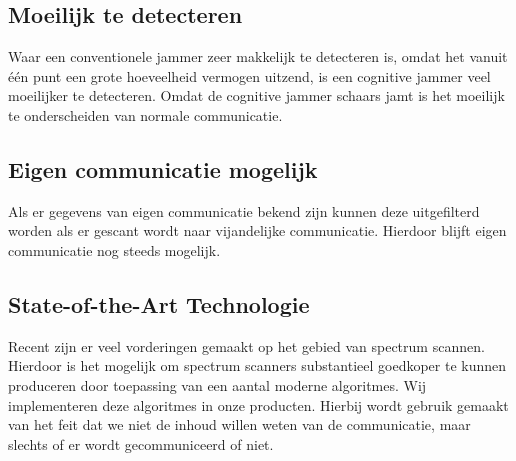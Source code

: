 \documentclass[oneside, a4paper, openany]{article}
\begin{document}
\subsection{Moeilijk te detecteren}
Waar een conventionele jammer zeer makkelijk te detecteren is, omdat het vanuit \'e\'en punt een grote hoeveelheid vermogen uitzend, is een cognitive jammer veel moeilijker te detecteren. Omdat de cognitive jammer schaars jamt is het moeilijk te onderscheiden van normale communicatie.

\subsection{Eigen communicatie mogelijk}
Als er gegevens van eigen communicatie bekend zijn kunnen deze uitgefilterd worden als er gescant wordt naar vijandelijke communicatie. Hierdoor blijft eigen communicatie nog steeds mogelijk.

\subsection{State-of-the-Art Technologie}
Recent zijn er veel vorderingen gemaakt op het gebied van spectrum scannen. Hierdoor is het mogelijk om spectrum scanners substantieel goedkoper te kunnen produceren door toepassing van een aantal moderne algoritmes. Wij implementeren deze algoritmes in onze producten. Hierbij wordt gebruik gemaakt van het feit dat we niet de inhoud willen weten van de communicatie, maar slechts of er wordt gecommuniceerd of niet.
\end{document}
